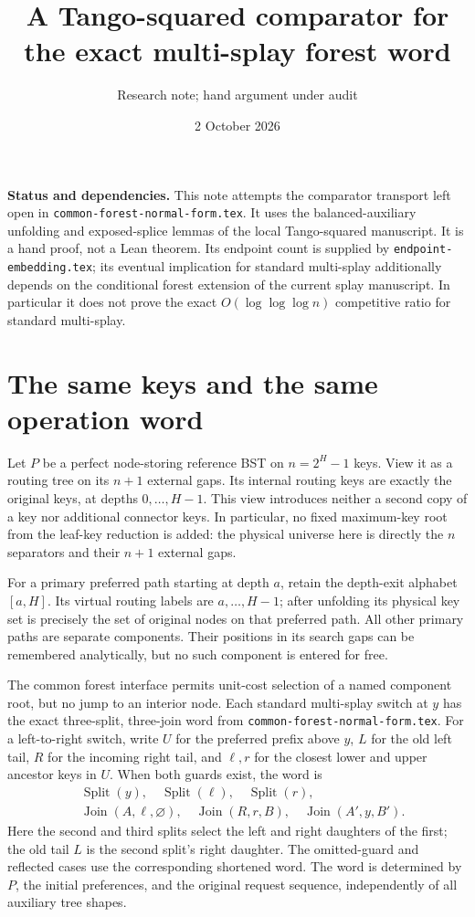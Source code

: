 \documentclass[11pt]{article}
\title{A Tango-squared comparator for the exact multi-splay forest word}
\author{Research note; hand argument under audit}
\date{2 October 2026}
\begin{document}
\maketitle

\noindent\textbf{Status and dependencies.}
This note attempts the comparator transport left open in
\texttt{common-forest-normal-form.tex}. It uses the balanced-auxiliary
unfolding and exposed-splice lemmas of the local Tango-squared manuscript.
It is a hand proof, not a Lean theorem. Its endpoint count is supplied
by \texttt{endpoint-embedding.tex}; its eventual implication for standard
multi-splay additionally depends on the conditional forest extension
of the current splay manuscript. In particular it does not prove the
exact $O(\log\log\log n)$ competitive ratio for standard multi-splay.

\section{The same keys and the same operation word}

Let $P$ be a perfect node-storing reference BST on $n=2^H-1$ keys.
View it as a routing tree on its $n+1$ external gaps. Its internal
routing keys are exactly the original keys, at depths $0,\ldots,H-1$.
This view introduces neither a second copy of a key nor additional
connector keys. In particular, no fixed maximum-key root from the
leaf-key reduction is added: the physical universe here is directly
the $n$ separators and their $n+1$ external gaps.

For a primary preferred path starting at depth $a$, retain the
depth-exit alphabet $[a,H]$. Its virtual routing labels are
$a,\ldots,H-1$; after unfolding its physical key set is precisely the
set of original nodes on that preferred path. All other primary paths
are separate components. Their positions in its search gaps can be
remembered analytically, but no such component is entered for free.

The common forest interface permits unit-cost selection of a named
component root, but no jump to an interior node. Each standard
multi-splay switch at $y$ has the exact three-split, three-join word
from \texttt{common-forest-normal-form.tex}. For a left-to-right switch,
write $U$ for the preferred prefix above $y$, $L$ for the old left
tail, $R$ for the incoming right tail, and $\ell,r$ for the closest
lower and upper ancestor keys in $U$. When both guards exist, the word is
\begin{align*}
 &\operatorname{Split}(y),\quad
   \operatorname{Split}(\ell),\quad
   \operatorname{Split}(r),\\
 &\operatorname{Join}(A,\ell,\varnothing),\quad
   \operatorname{Join}(R,r,B),\quad
   \operatorname{Join}(A',y,B').                 \tag{1}
\end{align*}
Here the second and third splits select the left and right daughters
of the first; the old tail $L$ is the second split's right daughter.
The omitted-guard and reflected cases use the corresponding shortened
word. The word is determined by $P$, the initial preferences, and the
original request sequence, independently of all auxiliary tree shapes.
\end{document}
